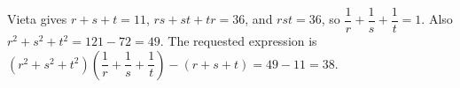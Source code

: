 Vieta gives $r+s+t=11$, $rs+st+tr=36$, and $rst=36$, so $\dfrac{1}{r}+\dfrac{1}{s}+\dfrac{1}{t}=1$. Also $r^2+s^2+t^2=121-72=49$. The requested expression is $(r^2+s^2+t^2)(\dfrac{1}{r}+\dfrac{1}{s}+\dfrac{1}{t})-(r+s+t)=49-11=\boxed{38}$.
